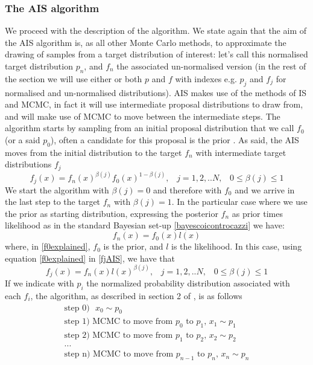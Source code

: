 \documentclass[12pt,mythesisstyle]{report}
\begin{document}
\subsubsection{The AIS algorithm}
We proceed with the description of the algorithm. We state again that the aim of the AIS algorithm \cite{annealedis} is, as all other Monte Carlo methods, to approximate the drawing of samples from a target distribution of interest: let's call this normalised target distribution $p_n$, and $f_n$ the associated un-normalised version (in the rest of the section we will use either or both $p$ and $f$ with indexes e.g. $p_j$ and $f_j$ for normalised and un-normalised distributions). AIS makes use of the methods of IS and MCMC, in fact it will use intermediate proposal distributions to draw from, and will make use of MCMC to move between the intermediate steps. The algorithm starts by sampling from an initial proposal distribution that we call $f_0$ (or a said $p_0$), often a candidate for this proposal is the prior \cite{annealedis}. As said, the AIS moves from the initial distribution to the target $f_n$ with intermediate target distributions $f_j$
\begin{equation}\label{fjAIS}
f_j(x)=f_n(x)^{\beta(j)} f_0(x)^{1-{\beta(j)}}, \;\;\; j=1,2,..N, \;\;\; 0\leq\beta(j)\leq1
\end{equation}
We start the algorithm with $\beta(j)=0$ and therefore with $f_0$ and we arrive in the last step to the target $f_n$ with $\beta(j)=1$. In the particular case where we use the prior as starting distribution, expressing the posterior $f_n$ as prior times likelihood as in the standard Bayesian set-up \eqref{bayescoicontrocazzi} we have:
\begin{equation}\label{f0explained}
f_n(x)=f_0(x)l(x)
\end{equation}
where, in \eqref{f0explained}, $f_0$ is the prior, and $l$ is the likelihood. In this case, using equation \eqref{f0explained} in \eqref{fjAIS}, we have that
\begin{equation}\label{fjsimplified}
f_j(x)=f_n(x)l(x)^{\beta(j)}, \;\;\; j=1,2,..N, \;\;\; 0\leq\beta(j)\leq1
\end{equation}
If we indicate with $p_i$ the normalized probability distribution associated with each $f_i$, the algorithm, as described in section 2 of \cite{annealedis}, is as follows
\begin{equation}\label{AISalgorithmSteps}
\begin{aligned}
\text{step 0)}  \text{ }x_{0}\sim p_{0} \\
\text{step 1)} \text{ MCMC to move from } p_0 \text{ to } p_1\text{, }x_{1}\sim p_{1}\\
\text{step 2)}  \text{ MCMC to move from } p_1 \text{ to } p_2\text{, }x_{2}\sim p_{2}\\
... \\
\text{step n)} \text{ MCMC to move from } p_{n-1} \text{ to } p_n\text{, }x_{n}\sim p_{n} \\
\end{aligned}
\end{equation}
\end{document}
